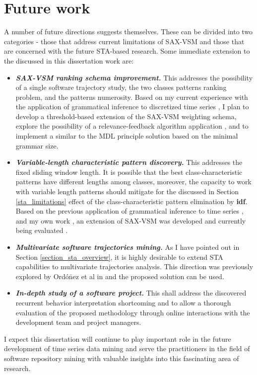 \section{Future work}\label{section_future_work}
A number of future directions suggests themselves. These can be divided into two categories - those that address current 
limitations of SAX-VSM and those that are concerned with the future STA-based research. Some immediate extension to the 
discussed in this dissertation work are:
\begin{itemize}
 \item \textit{\textbf{SAX-VSM ranking schema improvement.}} This addresses the possibility of a single software trajectory study, 
 the two classes patterns ranking problem, and the patterns numerosity. 
 Based on my current experience with the application of grammatical inference to discretized time series \cite{grammarviz2}, 
 I plan to develop a threshold-based extension of the SAX-VSM weighting schema, 
 explore the possibility of a relevance-feedback algorithm application \cite{intro_ir_Manning}, 
 and to implement a similar to the MDL principle \cite{mdl} solution based on the minimal grammar size.
 \item \textit{\textbf{Variable-length characteristic pattern discovery.}} This addresses the fixed sliding window length. 
 It is possible that the best class-characteristic patterns have different lengths among classes, moreover, the capacity to 
 work with variable length patterns should mitigate for the discussed in Section \ref{sta_limitations} effect of the class-characteristic pattern elimination by \textbf{idf}. Based on the previous application of grammatical inference to time series \cite{grammarviz}, and my own work \cite{grammarviz2}, an extension of SAX-VSM was developed and currently being evaluated \cite{saxvsm2}.
 \item \textit{\textbf{Multivariate software trajectories mining.}} As I have pointed out in Section \ref{section_sta_overview}, 
 it is highly desirable to extend STA capabilities to multivariate trajectories analysis. This direction was previously explored 
 by  Ord\'{o}\={n}ez et al in \cite{oates1, oates2} and the proposed solution can be used.
 \item \textit{\textbf{In-depth study of a software project.}} This shall address the discovered recurrent behavior
 interpretation shortcoming and to allow a thorough evaluation of the proposed methodology through online interactions with the development team and project managers. 
\end{itemize}

I expect this dissertation will continue to play important role in the future development of time series data mining and serve the practitioners in the field of software repository mining with valuable insights into this fascinating area of research.
